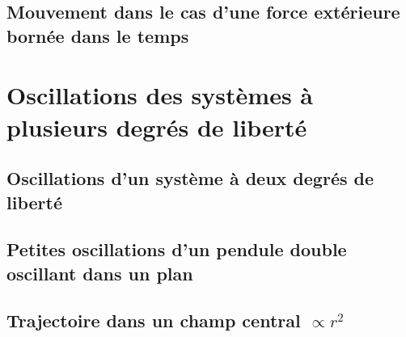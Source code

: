 \subsection{Mouvement dans le cas d'une force ext\'erieure born\'ee dans le temps}

\section{Oscillations des syst\`emes \`a plusieurs degr\'es de libert\'e}

\subsection{Oscillations d'un syst\`eme \`a deux degr\'es de libert\'e}

\subsection{Petites oscillations d'un pendule double oscillant dans un plan}

\subsection{Trajectoire dans un champ central $\propto r^{2}$}\label{PAR:23_EX3}